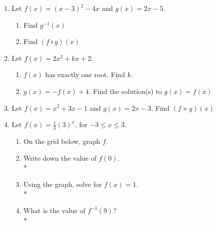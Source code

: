 \documentclass[]{book}
\begin{document}
\begin{enumerate}
\item Let $f(x) = (x-3)^2 - 4x$ and $g(x)=2x-5$. 
\begin{enumerate}
    \item Find $g^{-1}(x)$
    \item Find $(f \circ g) (x)$
\end{enumerate}

\item Let $f(x) = 2x^2 +kx + 2$.
\begin{enumerate}
    \item $f(x)$ has exactly one root. Find $k$.
    \item $g(x)=-f(x)+4$. Find the solution(s) to $g(x)=f(x)$
\end{enumerate}
    
\item Let $f(x) = x^2+3x-1$ and $g(x)=2x-3$. Find $(f \times g)(x)$

\newpage 

\item Let $ f(x) = \frac{1}{3}(3)^x$, for $-3 \leq x \leq 3$.
\begin{enumerate}
\item On the  grid below, graph $f$.
\item Write down the value of $f(0)$.\\*
\item Using the graph, solve for $f(x)= 1$.\\*
\item What is the value of $f^{-1}(9)$?\\*
\end{enumerate}



\begin{figure}[!htbp]
\begin{center}
\end{center}
\end{figure}
\end{enumerate}
\end{document}

